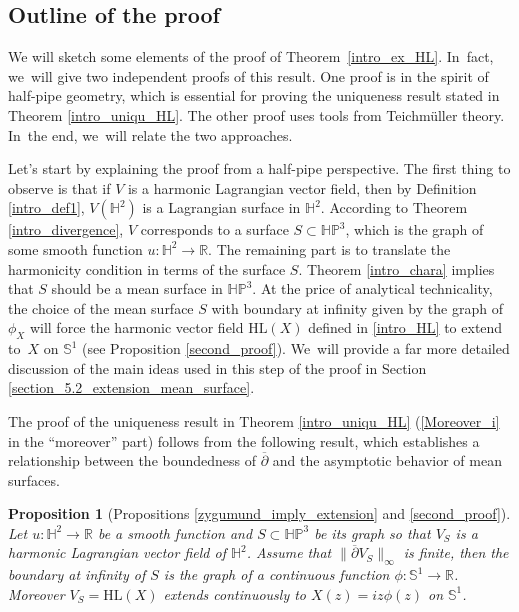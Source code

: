 \documentclass[10pt]{amsart}
\theoremstyle{plain}
\newtheorem{prop}[cor]{Proposition}
\theoremstyle{definition}
\newcommand{\HP}{\mathbb{HP}^3}
\begin{document}
\subsection{Outline of the proof}\label{outline_of_the_proof}

We will sketch some elements of the proof of Theorem~\ref{intro_ex_HL}. In~fact, we~will give two independent proofs of this result. One proof is in the spirit of half-pipe geometry, which is essential for proving the uniqueness result stated in Theorem \ref{intro_uniqu_HL}. The other proof uses tools from Teichmüller theory. In~the end, we~will relate the two approaches.

Let's start by explaining the proof from a half-pipe perspective. The first thing to observe is that if \(V \) is a harmonic Lagrangian vector field, then by Definition \ref{intro_def1}, \(V(\mathbb{H}^2) \) is a Lagrangian surface in \(\mathbb{H}^2 \). According to Theorem \ref{intro_divergence}, \(V \) corresponds to a surface \(S \subset \HP \), which is the graph of some smooth function \(u: \mathbb{H}^2 \to \mathbb{R} \). The remaining part is to translate the harmonicity condition in terms of the surface \(S \). Theorem \ref{intro_chara} implies that \(S \) should be a mean surface in \(\HP\). At the price of analytical technicality, the choice of the mean surface \(S \) with boundary at infinity given by the graph of \(\phi_X \) will force the harmonic vector field \(\mathrm{HL}(X)\) defined in \eqref{intro_HL} to extend to~\(X \) on \(\mathbb{S}^1\) (see Proposition \ref{second_proof}). We~will provide a far more detailed discussion of the main ideas used in this step of the proof in Section \ref{section_5.2_extension_mean_surface}.

The proof of the uniqueness result in Theorem \ref{intro_uniqu_HL} (\ie \eqref{Moreover_i}  in the ``moreover'' part) follows from the following result, which establishes a relationship between the boundedness of \(\overline{\partial} \) and the asymptotic behavior of mean surfaces.

\begin{prop}[Propositions \ref{zygumund_imply_extension} and \ref{second_proof}]\label{intro_pro_bounded_imple_extension}
Let \(u: \mathbb{H}^2 \to \mathbb{R} \) be a smooth function and \(S \subset \HP \) be its graph so that \(V_S \) is a harmonic Lagrangian vector field of \(\mathbb{H}^2\). Assume that \(\lVert \overline{\partial} V_S \rVert_{\infty}\) is finite, then the boundary at infinity of \(S \) is the graph of a continuous function \(\phi: \mathbb{S}^1 \to \mathbb{R}\). Moreover $V_S=\mathrm{HL}(X)$ extends continuously to $X(z)=iz\phi(z)$ on $\mathbb{S}^1$.
\end{prop}
\end{document}
